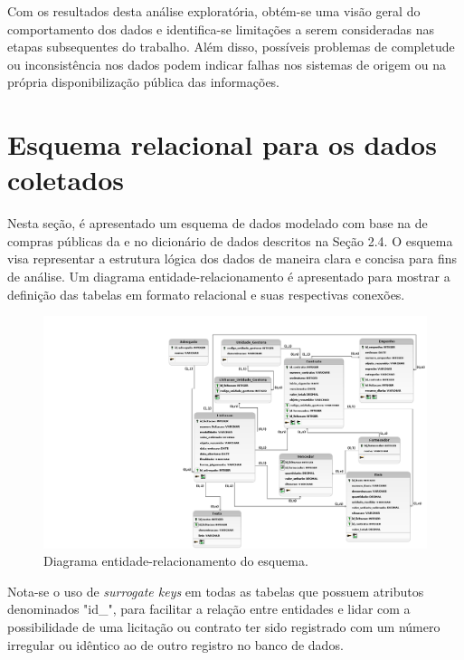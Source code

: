\documentclass[
	12pt,				%
	oneside,			%
	a4paper,			%
	chapter=TITLE,		%
	section=TITLE,		%
	english,			%
	brazil				%
	]{abntex2}
\begin{document}
Com os resultados desta análise exploratória, obtém-se uma visão geral do comportamento dos dados e identifica-se limitações a serem consideradas nas etapas subsequentes do trabalho. Além disso, possíveis problemas de completude ou inconsistência nos dados podem indicar falhas nos sistemas de origem ou na própria disponibilização pública das informações.

\section{Esquema relacional para os dados coletados}

Nesta seção, é apresentado um esquema de dados modelado com base na  de compras públicas da  e no dicionário de dados descritos na Seção 2.4. O esquema visa representar a estrutura lógica dos dados de maneira clara e concisa para fins de análise. Um diagrama entidade-relacionamento é apresentado para mostrar a definição das tabelas em formato relacional e suas respectivas conexões.

\begin{figure}[h]
\begin{center}
	\caption{\label{fig:diagrama_er}Diagrama entidade-relacionamento do esquema.}
	\includegraphics[trim={17.8cm 0 0 0},clip,width=1.1\textwidth]{images/modelo_logico_tcc_v5.png} %
\end{center}
\end{figure}

Nota-se o uso de \textit{surrogate keys} em todas as tabelas que possuem atributos denominados "id\_<nome da tabela>", para facilitar a relação entre entidades e lidar com a possibilidade de uma licitação ou contrato ter sido registrado com um número irregular ou idêntico ao de outro registro no banco de dados.
\end{document}
